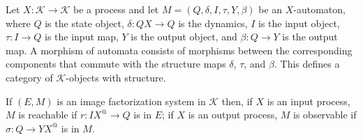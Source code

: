 Let $X : \mathcal{K} \longrightarrow \mathcal{K}$ be a process and let $M = (Q, \delta, I, \tau, Y, \beta)$ be an $X$-automaton, where $Q$ is the state object, $\delta: QX \to Q$ is the dynamics, $I$ is the input object, $\tau: I \to Q$ is the input map, $Y$ is the output object, and $\beta: Q \to Y$ is the output map. A morphism of automata consists of morphisms between the corresponding components that commute with the structure maps $\delta$, $\tau$, and $\beta$. This defines a category of $\mathcal{K}$-objects with structure.

If $(E, M)$ is an image factorization system in $\mathcal{K}$ then, if $X$ is an input process, $M$ is reachable if $r: IX^@ \longrightarrow Q$ is in $E$; if $X$ is an output process, $M$ is observable if $\sigma: Q \longrightarrow YX^@$ is in $M$.

